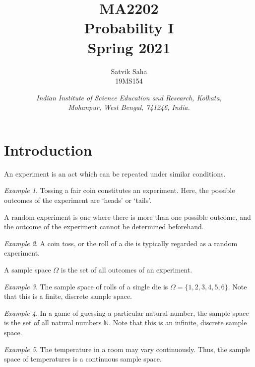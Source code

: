 \documentclass[11pt]{article}
\title{
    \Large\textsc{MA2202} \\
    \Huge \textbf{Probability I} \\
    \vspace{5pt}
    \Large{Spring 2021}
}
\author{
    \large Satvik Saha%
    \\\textsc{\small 19MS154}
}
\date{\normalsize
    \textit{Indian Institute of Science Education and Research, Kolkata, \\
    Mohanpur, West Bengal, 741246, India.} \\
}
\def\N{\mathbb{N}}
\theoremstyle{definition}
\theoremstyle{remark}
\newtheorem*{example}{Example}
\numberwithin{equation}{section}
\begin{document}
    \maketitle

    \section{Introduction}
    \begin{definition}[Experiment]
        An experiment is an act which can be repeated under similar conditions.
    \end{definition}
    \begin{example}
        Tossing a fair coin constitutes an experiment. Here, the possible outcomes
        of the experiment are `heads' or `tails'.
    \end{example}

    \begin{definition}
        A random experiment is one where there is more than one possible outcome, 
        and the outcome of the experiment cannot be determined beforehand.
    \end{definition}
    \begin{example}
        A coin toss, or the roll of a die is typically regarded as a random
        experiment.
    \end{example}
    
    \begin{definition}
        A sample space $\Omega$ is the set of all outcomes of an experiment.
    \end{definition}
    \begin{example}
        The sample space of rolls of a single die is $\Omega = \{1,2,3,4,5,6\}$.
        Note that this is a finite, discrete sample space.
    \end{example}
    \begin{example}
        In a game of guessing a particular natural number, the sample space is the
        set of all natural numbers $\N$. Note that this is an infinite, discrete
        sample space.
    \end{example}
    \begin{example}
        The temperature in a room may vary continuously. Thus, the sample space of
        temperatures is a continuous sample space.
    \end{example}
    
\end{document}
